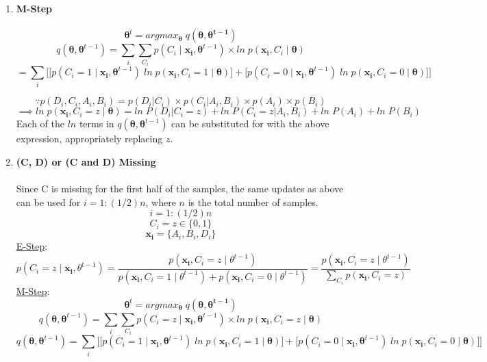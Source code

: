 \documentclass[english]{article}
\begin{document}
\begin{enumerate}
    \item \textbf{M-Step} \\ \\
    $$\bm{\theta}^t = arg max_{\bm{\theta}} \; q(\bm{\theta},\bm{\theta^{t-1}})$$
    $$ q(\bm{\theta},\bm{\theta}^{t-1}) = \sum_{i}\sum_{C_i}p(C_i \;|\; \mathbf{x_i}, \bm{\theta}^{t-1}) \times ln \; p(\mathbf{x_i},C_i \;|\; \bm{\theta})$$
    $$ = \sum_{i} \bigg[ \big[p(C_i = 1 \;|\; \mathbf{x_i}, \bm{\theta}^{t-1}) \; ln \; p(\mathbf{x_i},C_i = 1 \;|\; \bm{\theta})\big] + \big[ p(C_i = 0 \;|\; \mathbf{x_i}, \bm{\theta}^{t-1}) \; ln \; p(\mathbf{x_i},C_i = 0 \;|\; \bm{\theta}) \big] \bigg]$$
    
    $$\because p(D_i,C_i,A_i,B_i) = p(D_i|C_i) \times p(C_i|A_i,B_i) \times p(A_i) \times p(B_i)$$
    $$ \implies ln \; p(\mathbf{x_i},C_i = z \;|\; \bm{\theta}) = ln \; P(D_i | C_i = z) + ln \; P(C_i = z| A_i, B_i)  + ln \; P(A_i) + ln \; P(B_i)$$
    Each of the $ln$ terms in $q(\bm{\theta},\bm{\theta}^{t-1})$ can be substituted for with the above expression, appropriately replacing $z$. 
    
    
    \item \textbf{(C, D) or (C and D) Missing} \\ \\
    Since C is missing for the first half of the samples, the same updates as above can be used for $i = 1:(1/2)n$, where $n$ is the total number of samples. 
    $$i = 1:(1/2)n$$
    $$C_i = z \in \{0,1\}$$
    $$\mathbf{x_i} = \{A_i, B_i, D_i\}$$ 
    \underline{E-Step}:
    $$p(C_i = z\;|\; \mathbf{x_i}, \theta^{t-1}) = \frac{p(\mathbf{x_i}, C_i = z \;|\; \theta^{t-1})}{p(\mathbf{x_i}, C_i = 1 \;|\; \theta^{t-1}) + p(\mathbf{x_i}, C_i = 0 \;|\; \theta^{t-1})} = \frac{p(\mathbf{x_i}, C_i = z \;|\; \theta^{t-1})}{\sum_{C_i} p(\mathbf{x_i}, C_i = z)}$$
    \underline{M-Step}:
    $$\bm{\theta}^t = arg max_{\bm{\theta}} \; q(\bm{\theta},\bm{\theta^{t-1}})$$
    $$ q(\bm{\theta},\bm{\theta}^{t-1}) = \sum_{i}\sum_{C_i}p(C_i = z\;|\; \mathbf{x_i}, \bm{\theta}^{t-1}) \times ln \; p(\mathbf{x_i},C_i = z\;|\; \bm{\theta})$$
    $$q(\bm{\theta},\bm{\theta}^{t-1}) = \sum_{i} \bigg[ \big[p(C_i = 1 \;|\; \mathbf{x_i}, \bm{\theta}^{t-1}) \; ln \; p(\mathbf{x_i},C_i = 1 \;|\; \bm{\theta})\big] + \big[ p(C_i = 0 \;|\; \mathbf{x_i}, \bm{\theta}^{t-1}) \; ln \; p(\mathbf{x_i},C_i = 0 \;|\; \bm{\theta}) \big] \bigg]$$
  

\end{enumerate}
\end{document}
